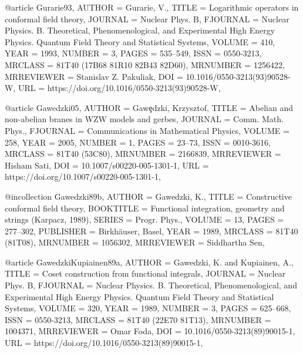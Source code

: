 @article {Gurarie93,
    AUTHOR = {Gurarie, V.},
     TITLE = {Logarithmic operators in conformal field theory},
   JOURNAL = {Nuclear Phys. B},
  FJOURNAL = {Nuclear Physics. B. Theoretical, Phenomenological, and
              Experimental High Energy Physics. Quantum Field Theory and
              Statistical Systems},
    VOLUME = {410},
      YEAR = {1993},
    NUMBER = {3},
     PAGES = {535--549},
      ISSN = {0550-3213},
   MRCLASS = {81T40 (17B68 81R10 82B43 82D60)},
  MRNUMBER = {1256422},
MRREVIEWER = {Stanislav Z. Pakuliak},
       DOI = {10.1016/0550-3213(93)90528-W},
       URL = {https://doi.org/10.1016/0550-3213(93)90528-W},
}

@article {Gawedzki05,
    AUTHOR = {Gaw\c{e}dzki, Krzysztof},
     TITLE = {Abelian and non-abelian branes in {WZW} models and gerbes},
   JOURNAL = {Comm. Math. Phys.},
  FJOURNAL = {Communications in Mathematical Physics},
    VOLUME = {258},
      YEAR = {2005},
    NUMBER = {1},
     PAGES = {23--73},
      ISSN = {0010-3616},
   MRCLASS = {81T40 (53C80)},
  MRNUMBER = {2166839},
MRREVIEWER = {Hisham Sati},
       DOI = {10.1007/s00220-005-1301-1},
       URL = {https://doi.org/10.1007/s00220-005-1301-1},
}

@incollection {Gawedzki89b,
    AUTHOR = {Gaw\polhk edzki, K.},
     TITLE = {Constructive conformal field theory},
 BOOKTITLE = {Functional integration, geometry and strings ({K}arpacz,
              1989)},
    SERIES = {Progr. Phys.},
    VOLUME = {13},
     PAGES = {277--302},
 PUBLISHER = {Birkh\"{a}user, Basel},
      YEAR = {1989},
   MRCLASS = {81T40 (81T08)},
  MRNUMBER = {1056302},
MRREVIEWER = {Siddhartha Sen},
}

@article {GawedzkiKupiainen89a,
    AUTHOR = {Gaw\polhk edzki, K. and Kupiainen, A.},
     TITLE = {Coset construction from functional integrals},
   JOURNAL = {Nuclear Phys. B},
  FJOURNAL = {Nuclear Physics. B. Theoretical, Phenomenological, and
              Experimental High Energy Physics. Quantum Field Theory and
              Statistical Systems},
    VOLUME = {320},
      YEAR = {1989},
    NUMBER = {3},
     PAGES = {625--668},
      ISSN = {0550-3213},
   MRCLASS = {81T40 (22E70 81T13)},
  MRNUMBER = {1004371},
MRREVIEWER = {Omar Foda},
       DOI = {10.1016/0550-3213(89)90015-1},
       URL = {https://doi.org/10.1016/0550-3213(89)90015-1},
}

